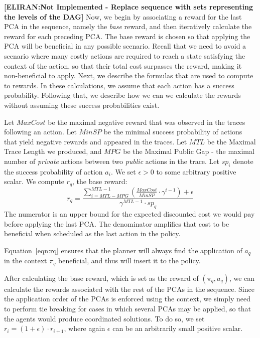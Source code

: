 \documentclass[letterpaper]{article} %
\newcommand{\eliran}[1]{\textbf{[\color{red}ELIRAN:#1]}}
\begin{document}
\eliran{Not Implemented - Replace sequence with sets representing the levels of the DAG}
Now, we begin by associating a reward for the last PCA in the sequence, namely the \emph{base} reward, and then iteratively calculate the reward for each preceding PCA.
The base reward is chosen so that applying the PCA will be beneficial in any possible scenario. Recall that we need to avoid a scenario where many costly actions are required to reach a state satisfying the context of the action, so that their total cost surpasses the reward, making it non-beneficial to apply.
Next, we describe the formulas that are used to compute to rewards. In these calculations, we assume that each action has a success probability. Following that, we describe how we can we calculate the rewards without assuming these success probabilities exist.

Let $MaxCost$ be the maximal negative reward that was observed in the traces following an action. Let $MinSP$ be the minimal success probability of actions that yield negative rewards and appeared in the traces. Let $MTL$ be the Maximal Trace Length we produced, and $MPG$ be the Maximal Public Gap - the maximal number of \emph{private} actions between two \emph{public} actions in the trace. Let $sp_i$ denote the success probability of action $a_i$. We set $\epsilon > 0$ to some arbitrary positive scalar. We compute $r_q$, the base reward:
\begin{equation}
\label{eqn:rq}
   r_q = \frac{\sum_{i=MTL - MPG }^{MTL-1}(\frac{MaxCost}{MinSP} \cdot \gamma^{i-1})+ \epsilon}{\gamma^{MTL-1}\cdot sp_q} 
\end{equation}%
The numerator is an upper bound for the expected discounted cost we would pay before applying the last PCA. The denominator amplifies that cost to be beneficial when scheduled as the last action in the policy.

Equation~\ref{eqn:rq} ensures that the planner will always find the application of $a_q$ in the context $\pi_q$ beneficial, and thus will insert it to the policy.

After calculating the base reward, which is set as the reward of $(\pi_q, a_q)$, we can calculate the rewards associated with the rest of the PCAs in the sequence. Since the application order of the PCAs is enforced using the context, we simply need to perform tie breaking for cases in which several PCAs may be applied, so that the agents would produce coordinated solutions.
To do so, we set $r_i=(1+\epsilon)\cdot r_{i+1}$, where again $\epsilon$ can be an arbitrarily small positive scalar.
\end{document}
